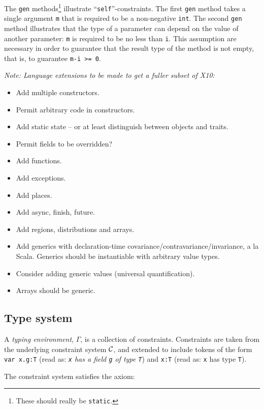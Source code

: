 \documentclass{article}
\def\Xten{{\sf X10}}
\begin{document}
\begin{example}[List]
The {\tt gen} methods\footnote{These should really be {\tt static}.}
illustrate ``{\tt self}''-constraints. The first {\tt gen} method
takes a single argument {\tt m} that is required to be a non-negative
{\tt int}.  The second {\tt gen} method illustrates that the type of a
parameter can depend on the value of another parameter: {\tt m} is
required to be no less than {\tt i}. This assumption are necessary in
order to guarantee that the result type of the method is not empty,
that is, to guarantee {\tt m-i >= 0}.
\end{example}

{\em Note:
Language extensions to be made to get a fuller subset of \Xten:

\begin{itemize}
  \item Add multiple constructors.
  \item Permit arbitrary code in constructors.
  \item Add static state -- or at least distinguish between objects and traits.
  \item Permit fields to be overridden?
  \item Add functions.
  \item Add exceptions.
  \item Add places.
  \item Add async, finish, future.
  \item Add regions, distributions and arrays.
  \item Add generics with declaration-time
  covariance/contravariance/invariance, a la Scala.  Generics should
  be instantiable with arbitrary value types.
  \item Consider adding generic values (universal quantification).
  \item Arrays should be generic.
\end{itemize}
}

\subsection{Type system}

A {\em typing environment}, $\Gamma$, is a collection of
constraints. Constraints are taken from the underlying constraint
system $\cal C$, and extended to include tokens of the form {\tt var
x.g:T} (read as: {\em {\tt x} has a field {\tt g} of type {\tt T}}) 
and {\tt x:T} (read as: {\tt x} has type {\tt T}).

The constraint system satisfies the axiom:
\end{document}
